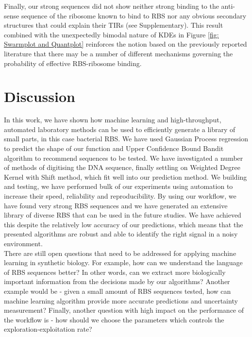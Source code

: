 \documentclass{article}
\begin{document}
Finally, our strong sequences did not show neither strong binding to the anti-sense sequence of the ribosome known to bind to RBS nor any obvious secondary structures that could explain their TIRs (see Supplementary).
This result combined with the unexpectedly bimodal nature of KDEs in Figure \ref{fig: Swarmplot and Quantplot} reinforces the notion based on the previously reported literature \cite{Saito2020,EspahBorujeni2016} that there may be a number of different mechanisms governing the probability of effective RBS-ribosome binding.\\


\section{Discussion}

In this work, we have shown how machine learning and high-throughput, automated laboratory methods can be used to efficiently generate a library of small parts, in this case bacterial RBS. 
We have used Gaussian Process regression to predict the shape of our function and Upper Confidence Bound Bandit algorithm to recommend sequences to be tested.
We have investigated a number of methods of digitising the DNA sequence, finally settling on Weighted Degree Kernel with Shift method, which fit well into our prediction method.
We building and testing, we have performed bulk of our experiments using automation to increase their speed, reliability and reproducibility.
By using our workflow, we have found very strong RBS sequences and we have generated an extensive library of diverse RBS that can be used in the future studies.
We have achieved this despite the relatively low accuracy of our predictions, which means that the presented algorithms are robust and able to identify the right signal in a noisy environment. \\

There are still open questions that need to be addressed for applying machine learning in synthetic biology.
For example, how can we understand the language of RBS sequences better?
In other words, can we extract more biologically important information from the decisions made by our algorithms?
Another example would be - given a small amount of RBS sequences tested, how can machine learning algorithm provide more accurate predictions and uncertainty measurement? 
Finally, another question with high impact on the performance of the workflow is - how should we choose the parameters which controls the exploration-exploitation rate? \\
\end{document}

